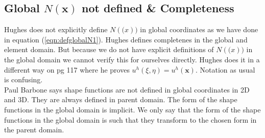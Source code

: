 \documentclass{article}
\begin{document}
\subsection{Global $N(\mathbf{x})$ not defined \& Completeness}
Hughes does not explicitly define $N(\mathbf(x))$ in global coordinates as we have done in equation (\ref{eqn:defglobalN1}). Hughes defines completenes in the global and element domain. But because we do not have explicit definitions of $N(\mathbf(x))$ in the global domain we cannot verify this for ourselves directly. Hughes does it in a different way on pg 117 where he proves $u^h(\xi,\eta)=u^h(\mathbf{x})$. Notation as usual is confusing.\\
Paul Barbone says shape functions are not defined in global coordinates in 2D and 3D. They are always defined in parent domain. The form of the shape functions in the global domain is implicit. We only say that the form of the shape functions in the global domain is such that they transform to the chosen form in the parent domain.
\end{document}

